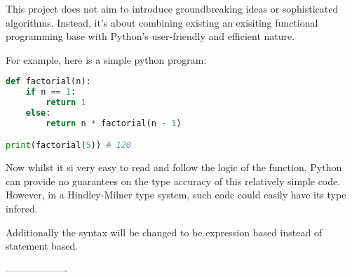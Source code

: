 \documentclass{l4proj}
\begin{document}
This project does not aim to introduce groundbreaking ideas or sophisticated algorithms. 
Instead, it's about combining existing an exisiting functional programming base with Python's user-friendly and efficient nature.

For example, here is a simple python program:

\begin{lstlisting}[language=Python, caption=A simple python program to find the factorial of a given number (n).]
def factorial(n):
    if n == 1:
        return 1
    else:
        return n * factorial(n - 1)

print(factorial(5)) # 120
\end{lstlisting}

Now whilst it si very easy to read and follow the logic of the function, Python can provide no guarantees on the type accuracy of this relatively simple code.
However, in a Hindley-Milner type system, such code could easily have its type infered.

Additionally the syntax will be changed to be expression based instead of statement based.






\begin{center}
    -------------------
\end{center}


\end{document}
